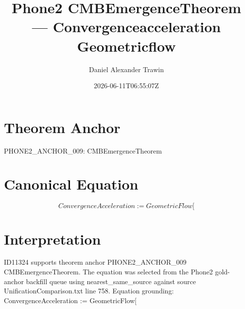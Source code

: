 \documentclass[11pt]{article}
\title{Phone2 CMBEmergenceTheorem — Convergenceacceleration Geometricflow}
\author{Daniel Alexander Trawin}
\date{2026-06-11T06:55:07Z}
\begin{document}
\maketitle
\section*{Theorem Anchor}
PHONE2_ANCHOR_009: CMBEmergenceTheorem
\section*{Canonical Equation}
\[
ConvergenceAcceleration := GeometricFlow[
\]
\section*{Interpretation}
ID11324 supports theorem anchor PHONE2_ANCHOR_009 CMBEmergenceTheorem. The equation was selected from the Phone2 gold-anchor backfill queue using nearest_same_source against source UnificationComparison.txt line 758. Equation grounding: ConvergenceAcceleration := GeometricFlow[
\end{document}

